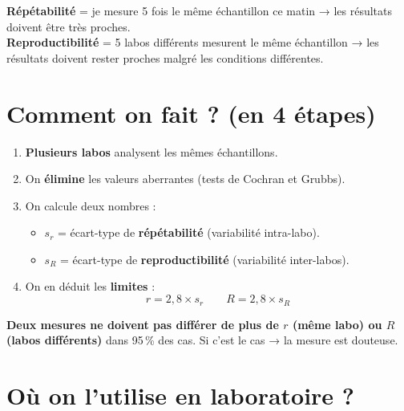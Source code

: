 \documentclass[11pt,a4paper]{article}
\begin{document}
\vspace{0.2cm}

\begin{labo}[title={\faFlask\quad Image simple}]
\textbf{Répétabilité} = je mesure 5 fois le même échantillon ce matin → les résultats doivent être très proches.\\
\textbf{Reproductibilité} = 5 labos différents mesurent le même échantillon → les résultats doivent rester proches malgré les conditions différentes.
\end{labo}

\section*{\faCalculator\quad Comment on fait ? (en 4 étapes)}

\begin{enumerate}[leftmargin=1.2cm, itemsep=4pt]
    \item \textbf{Plusieurs labos} analysent les mêmes échantillons.
    \item On \textbf{élimine} les valeurs aberrantes (tests de Cochran et Grubbs).
    \item On calcule deux nombres :
    \begin{itemize}
        \item \(s_r\) = écart-type de \textbf{répétabilité} (variabilité intra-labo).
        \item \(s_R\) = écart-type de \textbf{reproductibilité} (variabilité inter-labos).
    \end{itemize}
    \item On en déduit les \textbf{limites} :
    \[
    r = 2{,}8 \times s_r \qquad R = 2{,}8 \times s_R
    \]
\end{enumerate}

\begin{attention}[title={\faExclamationTriangle\quad À retenir absolument}]
\textbf{Deux mesures ne doivent pas différer de plus de \(r\) (même labo) ou \(R\) (labos différents)} dans 95\,\% des cas. Si c'est le cas → la mesure est douteuse.
\end{attention}

\section*{\faBuilding\quad Où on l'utilise en laboratoire ?}
\end{document}
